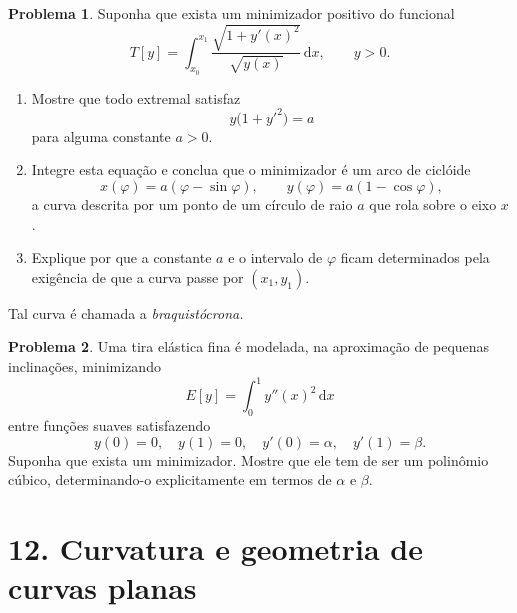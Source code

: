 \documentclass[10pt,a4paper]{amsart}
\renewcommand{\d}{\mathrm{d}}
\theoremstyle{definition}
\newtheorem{problema}{Problema}
\begin{document}
\begin{problema}
Suponha que exista um minimizador positivo do funcional
\[
    T[y]=\int_{x_0}^{x_1}\frac{\sqrt{1+y'(x)^2}}{\sqrt{y(x)}}\,\d x,
    \qquad y>0.
\]
\begin{enumerate}
    \item[(a)]Mostre que todo extremal satisfaz
\[
    y\bigl(1+y'^2\bigr)=a
\]
para alguma constante $a>0$. 
 \item Integre esta equação e conclua que o minimizador é um arco de
    ciclóide
    \[
        x(\varphi)=a(\varphi-\sin\varphi),
        \qquad
        y(\varphi)=a(1-\cos\varphi),
    \]
    a curva descrita por um ponto de um círculo de raio $a$ que rola sobre o
    eixo $x$.
    \item Explique por que a constante $a$ e o intervalo de $\varphi$ ficam
    determinados pela exigência de que a curva passe por $(x_1,y_1)$.
\end{enumerate}

Tal curva é chamada a  \emph{braquistócrona.}
\end{problema}


\begin{problema}
Uma tira elástica fina é modelada, na aproximação de pequenas inclinações,
minimizando
\[
    E[y]=\int_0^1 y''(x)^2\,\d x
\]
entre funções suaves satisfazendo
\[
    y(0)=0,\quad y(1)=0,\quad y'(0)=\alpha,\quad y'(1)=\beta.
\]
Suponha que exista um minimizador. Mostre que ele tem de ser um polinômio cúbico, determinando-o explicitamente em termos
de $\alpha$ e $\beta$.
\end{problema}


\section*{12. Curvatura e geometria de curvas planas}


\vspace{4mm}
\end{document}

